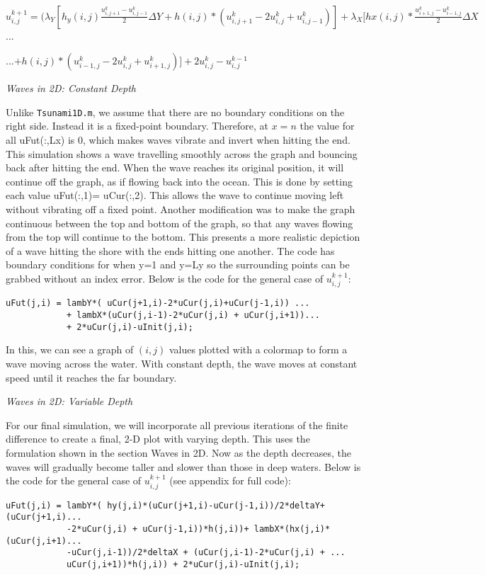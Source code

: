 \documentclass[12pt]{article}
\begin{document}
\begin{enumerate}
{\paragraph{}
\centerline{
$u_{i,j}^{k+1} = (\lambda_Y[ h_y(i,j)\frac{ u_{i,j+1}^k - u_{i,j-1}^k}{2} \Delta Y + h(i,j)*(u_{i,j+1}^k-2u_{i,j}^k + u_{i,j-1}^k)] + \lambda_X[hx(i,j)*\frac{u_{i+1,j}^k - u_{i-1,j}^k}{2} \Delta X$...
}

\centerline{...$+ h(i,j)*(u_{i-1,j}^k - 2u_{i,j}^k + u_{i+1,j}^k)] + 2u_{i,j}^k -u_{i,j}^{k-1}$
}

\large{\item\textit{Waves in 2D: Constant Depth}}

\normalsize{Unlike \texttt{Tsunami1D.m}, we assume that there are no boundary conditions on the right side. Instead it is a fixed-point boundary. Therefore, at $x=n$ the value for all uFut(:,Lx) is 0, which makes waves vibrate and invert when hitting the end. This simulation shows a wave travelling smoothly across the graph and bouncing back after hitting the end. When the wave reaches its original position, it will continue off the graph, as if flowing back into the ocean. This is done by setting each value uFut(:,1)= uCur(:,2). This allows the wave to continue moving left without vibrating off a fixed point. Another modification was to make the graph continuous between the top and bottom of the graph, so that any waves flowing from the top will continue to the bottom. This presents a more realistic depiction of a wave hitting the shore with the ends hitting one another. The code has boundary conditions for when y=1 and y=Ly so the surrounding points can be grabbed without an index error. Below is the code for the general case of $u_{i,j}^{k+1}$:

\begin{verbatim}
uFut(j,i) = lambY*( uCur(j+1,i)-2*uCur(j,i)+uCur(j-1,i)) ...
            + lambX*(uCur(j,i-1)-2*uCur(j,i) + uCur(j,i+1))...
            + 2*uCur(j,i)-uInit(j,i);
\end{verbatim}
In this, we can see a graph of $(i,j)$ values plotted with a colormap to form a wave moving across the water.  With constant depth, the wave moves at constant speed until it reaches the far boundary.  

\large{\item\textit{Waves in 2D: Variable Depth}}

\normalsize{For our final simulation, we will incorporate all previous iterations of the finite difference to create a final, 2-D plot with varying depth. This uses the formulation shown in the section Waves in 2D. Now as the depth decreases, the waves will gradually become taller and slower than those in deep waters. Below is the code for the general case of $u_{i,j}^{k+1}$ (see appendix for full code): }
\begin{verbatim}
uFut(j,i) = lambY*( hy(j,i)*(uCur(j+1,i)-uCur(j-1,i))/2*deltaY+(uCur(j+1,i)...
            -2*uCur(j,i) + uCur(j-1,i))*h(j,i))+ lambX*(hx(j,i)*(uCur(j,i+1)...
            -uCur(j,i-1))/2*deltaX + (uCur(j,i-1)-2*uCur(j,i) + ...
            uCur(j,i+1))*h(j,i)) + 2*uCur(j,i)-uInit(j,i);
\end{verbatim}

}}
\end{enumerate}
\end{document}
